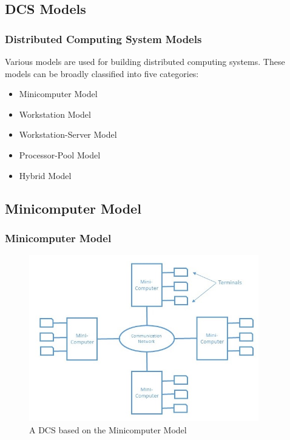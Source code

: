 \documentclass{beamer}
\begin{document}
\subsection{DCS Models}
\begin{frame}
    \frametitle{Distributed Computing System Models}
    Various models are used for building distributed computing systems. These models can be broadly classified into five categories:
    \begin{itemize}
        \item {Minicomputer Model}
        \item {Workstation Model}
        \item {Workstation-Server Model}
        \item {Processor-Pool Model}
        \item {Hybrid Model}
    \end{itemize}
    \vspace{3cm}
\end{frame}



\subsection{Minicomputer Model}
\begin{frame}
    \frametitle{Minicomputer Model}
    \begin{figure}
        \centering
        \includegraphics[width=10cm]{miniComputerModel}
        \caption{A DCS based on the Minicomputer Model}\label{minicomputermodel}
        \end{figure}
        \vspace{3cm}
\end{frame}
\end{document}
